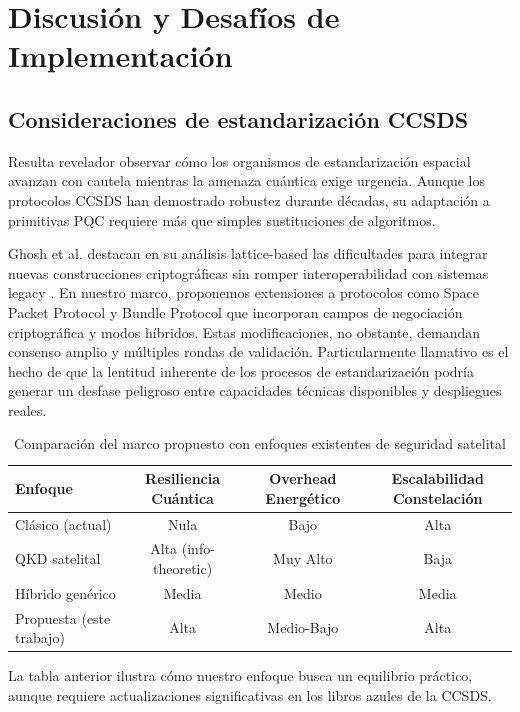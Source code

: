 \section{Discusión y Desafíos de Implementación}

\subsection{Consideraciones de estandarización CCSDS}

Resulta revelador observar cómo los organismos de estandarización espacial avanzan con cautela mientras la amenaza cuántica exige urgencia. Aunque los protocolos CCSDS han demostrado robustez durante décadas, su adaptación a primitivas PQC requiere más que simples sustituciones de algoritmos. 

Ghosh et al. destacan en su análisis lattice-based las dificultades para integrar nuevas construcciones criptográficas sin romper interoperabilidad con sistemas legacy \cite{Ghosh2026}. En nuestro marco, proponemos extensiones a protocolos como Space Packet Protocol y Bundle Protocol que incorporan campos de negociación criptográfica y modos híbridos. Estas modificaciones, no obstante, demandan consenso amplio y múltiples rondas de validación. Particularmente llamativo es el hecho de que la lentitud inherente de los procesos de estandarización podría generar un desfase peligroso entre capacidades técnicas disponibles y despliegues reales.

\begin{table}[t]
\centering
\caption{Comparación del marco propuesto con enfoques existentes de seguridad satelital}
\label{tab:comparacion_enfoques}
\begin{tabular}{lccc}
\hline
\textbf{Enfoque} & \textbf{Resiliencia Cuántica} & \textbf{Overhead Energético} & \textbf{Escalabilidad Constelación} \\
\hline
Clásico (actual) & Nula & Bajo & Alta \\
QKD satelital & Alta (info-theoretic) & Muy Alto & Baja \\
Híbrido genérico & Media & Medio & Media \\
Propuesta (este trabajo) & Alta & Medio-Bajo & Alta \\
\hline
\end{tabular}
\end{table}

La tabla anterior ilustra cómo nuestro enfoque busca un equilibrio práctico, aunque requiere actualizaciones significativas en los libros azules de la CCSDS.

